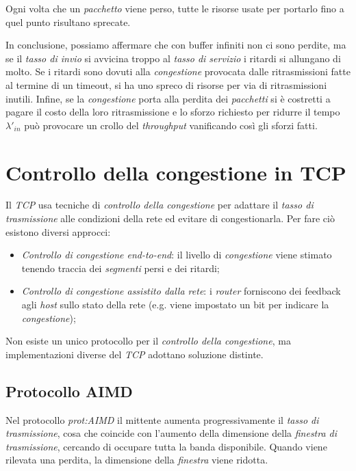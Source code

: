 \begin{note}
    Ogni volta che un \emph{pacchetto} viene perso, tutte le risorse usate
    per portarlo fino a quel punto risultano sprecate.
\end{note}\noindent
In conclusione, possiamo affermare che con buffer infiniti non ci sono perdite, ma
se il \emph{tasso di invio} si avvicina troppo al \emph{tasso di servizio} i
ritardi si allungano di molto. Se i ritardi sono dovuti alla \emph{congestione}
provocata dalle ritrasmissioni fatte al termine di un timeout, si ha uno spreco
di risorse per via di ritrasmissioni inutili. Infine, se la \emph{congestione}
porta alla perdita dei \emph{pacchetti} si è costretti a pagare il costo della
loro ritrasmissione e lo sforzo richiesto per ridurre il tempo $\lambda'_{in}$
può provocare un crollo del \emph{throughput} vanificando così gli sforzi fatti.

\section{Controllo della congestione in TCP}
Il \emph{TCP} usa tecniche di \emph{controllo della congestione} per adattare
il \emph{tasso di trasmissione} alle condizioni della rete ed evitare di
congestionarla. Per fare ciò esistono diversi approcci:
\begin{itemize}
    \item \emph{Controllo di congestione end-to-end}: il livello di
    \emph{congestione} viene stimato tenendo traccia dei \emph{segmenti} persi
    e dei ritardi;
    \item \emph{Controllo di congestione assistito dalla rete}: i \emph{router}
    forniscono dei feedback agli \emph{host} sullo stato della rete
    (e.g. viene impostato un bit per indicare la \emph{congestione});
\end{itemize}
Non esiste un unico protocollo per il \emph{controllo della congestione}, ma
implementazioni diverse del \emph{TCP} adottano soluzione distinte.

\subsection{Protocollo AIMD}
Nel protocollo \emph{\gls{prot:AIMD}} il mittente aumenta progressivamente il
\emph{tasso di trasmissione}, cosa che coincide con l'aumento della dimensione
della \emph{finestra di trasmissione}, cercando di occupare tutta la banda
disponibile. Quando viene rilevata una perdita, la dimensione della \emph{finestra}
viene ridotta.


